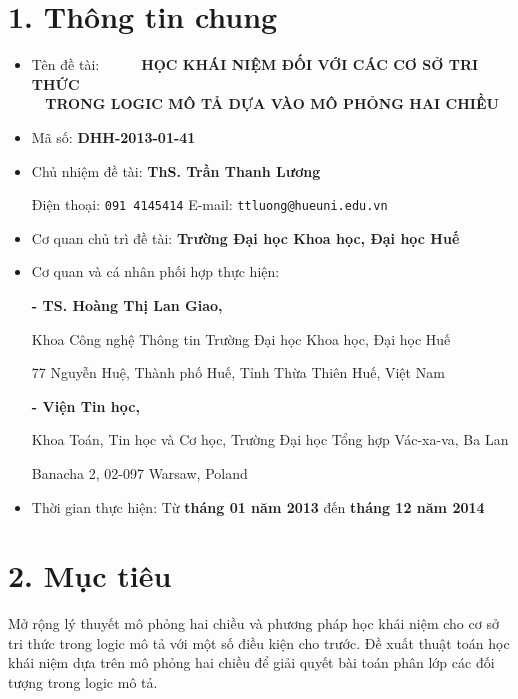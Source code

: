 \section*{1. Thông tin chung}
\begin{itemize}
	\item Tên đề tài:~~~~~~\textbf{HỌC KHÁI NIỆM ĐỐI VỚI CÁC CƠ SỞ TRI THỨC\\
	\mbox{~}\hspace{8ex} TRONG LOGIC MÔ TẢ DỰA VÀO MÔ PHỎNG HAI CHIỀU}\\[-0.8cm]
	\item Mã số: {\bf DHH-2013-01-41}\\[-0.8cm]
	\item Chủ nhiệm đề tài: {\bf ThS. Trần Thanh Lương}
	
	\vspace{-0.5ex}
	Điện thoại: \texttt{091 4145414} \qquad\qquad\qquad\qquad E-mail: \texttt{ttluong@hueuni.edu.vn}\\[-0.8cm]
	\item Cơ quan chủ trì đề tài: {\bf Trường Đại học Khoa học, Đại học Huế}\\[-0.8cm]
	\item Cơ quan và cá nhân phối hợp thực hiện:
	
	{\bf - TS. Hoàng Thị Lan Giao,}
	
	\vspace{-0.5ex}	
	Khoa Công nghệ Thông tin Trường Đại học Khoa học, Đại học Huế
	
	\vspace{-0.5ex}	
	77 Nguyễn Huệ, Thành phố Huế, Tỉnh Thừa Thiên Huế, Việt Nam
	
	{\bf - Viện Tin học,}
	
	\vspace{-0.5ex}	
	Khoa Toán, Tin học và Cơ học, Trường Đại học Tổng hợp Vác-xa-va, Ba Lan
	
	\vspace{-0.5ex}	
	Banacha 2, 02-097 Warsaw, Poland\\[-0.8cm]
	
	\item Thời gian thực hiện: Từ {\bf tháng 01 năm 2013} đến {\bf tháng 12 năm 2014}
\end{itemize}

\section*{2. Mục tiêu}
Mở rộng lý thuyết mô phỏng hai chiều và phương pháp học khái niệm cho cơ sở tri thức trong logic mô tả với một số điều kiện cho trước.
Đề xuất thuật toán học khái niệm dựa trên mô phỏng hai chiều để giải quyết bài toán phân lớp các đối tượng trong logic mô tả.

